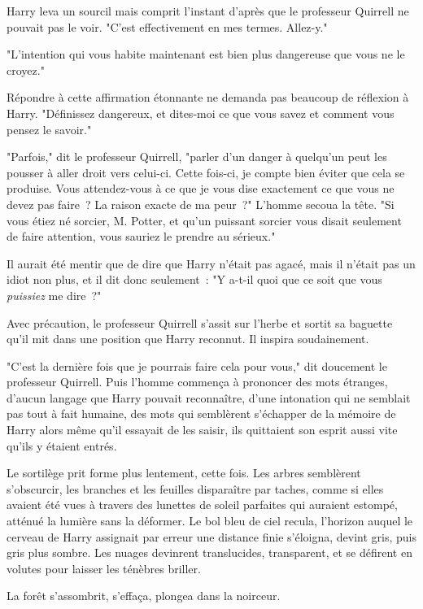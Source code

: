 Harry leva un sourcil mais comprit l'instant d'après que le professeur Quirrell ne pouvait pas le voir. "C'est effectivement en mes termes. Allez-y."

"L'intention qui vous habite maintenant est bien plus dangereuse que vous ne le croyez."

Répondre à cette affirmation étonnante ne demanda pas beaucoup de réflexion à Harry. "Définissez dangereux, et dites-moi ce que vous savez et comment vous pensez le savoir."

"Parfois," dit le professeur Quirrell, "parler d'un danger à quelqu'un peut les pousser à aller droit vers celui-ci. Cette fois-ci, je compte bien éviter que cela se produise. Vous attendez-vous à ce que je vous dise exactement ce que vous ne devez pas faire~? La raison exacte de ma peur~?" L'homme secoua la tête. "Si vous étiez né sorcier, M. Potter, et qu'un puissant sorcier vous disait seulement de faire attention, vous sauriez le prendre au sérieux."

Il aurait été mentir que de dire que Harry n'était pas agacé, mais il n'était pas un idiot non plus, et il dit donc seulement~: "Y a-t-il quoi que ce soit que vous \emph{puissiez} me dire~?"

Avec précaution, le professeur Quirrell s'assit sur l'herbe et sortit sa baguette qu'il mit dans une position que Harry reconnut. Il inspira soudainement.

"C'est la dernière fois que je pourrais faire cela pour vous," dit doucement le professeur Quirrell. Puis l'homme commença à prononcer des mots étranges, d'aucun langage que Harry pouvait reconnaître, d'une intonation qui ne semblait pas tout à fait humaine, des mots qui semblèrent s'échapper de la mémoire de Harry alors même qu'il essayait de les saisir, ils quittaient son esprit aussi vite qu'ils y étaient entrés.

Le sortilège prit forme plus lentement, cette fois. Les arbres semblèrent s'obscurcir, les branches et les feuilles disparaître par taches, comme si elles avaient été vues à travers des lunettes de soleil parfaites qui auraient estompé, atténué la lumière sans la déformer. Le bol bleu de ciel recula, l'horizon auquel le cerveau de Harry assignait par erreur une distance finie s'éloigna, devint gris, puis gris plus sombre. Les nuages devinrent translucides, transparent, et se défirent en volutes pour laisser les ténèbres briller.

La forêt s'assombrit, s'effaça, plongea dans la noirceur.

